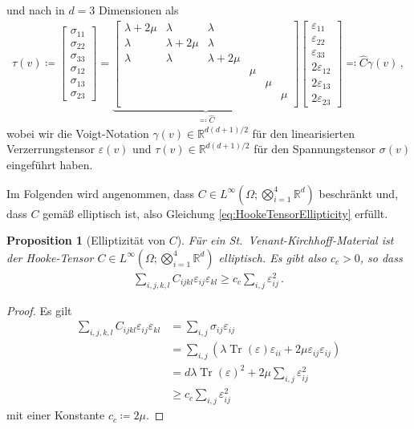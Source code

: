 \documentclass{scrartcl}
\newcounter{everything}
\newtheorem{proposition}[everything]{Proposition}
\def\R{\mathbb{R}}
\def\e{\varepsilon}
\newcommand{\hC}{\hat{C}}
\DeclareMathOperator{\Tr}{Tr}       	  %
\newcommand{\vect}[1]{\begin{bmatrix} #1 \end{bmatrix}}
\begin{document}
und nach \cite[S.246]{Alb-2002} in $d=3$ Dimensionen als
\begin{align}
	\tau(v)\coloneqq
	\vect{\sigma_{11} \\ \sigma_{22} \\ \sigma_{33} \\ \sigma_{12} \\ \sigma_{13} \\ \sigma_{23}}
	= \underbrace{\begin{bmatrix}
		\lambda+2\mu & \lambda & \lambda & & & \\
		\lambda & \lambda+2\mu & \lambda & & & \\
		\lambda & \lambda & \lambda+2\mu & & & \\
		& & & \mu & & \\
		& & & & \mu & \\
		& & & & & \mu \\
	\end{bmatrix}}_{\eqqcolon \hC}
	\vect{\e_{11} \\ \e_{22} \\ \e_{33} \\ 2\e_{12} \\ 2\e_{13} \\ 2\e_{23}}
	\eqqcolon \hC\gamma(v)\,,
	\label{eq:DefinitionVoigtD3}
\end{align}
wobei wir die Voigt-Notation $\gamma(v)\in\R^{d(d+1)/2}$ für den linearisierten Verzerrungstensor $\e(v)$ und $\tau(v)\in\R^{d(d+1)/2}$ für den Spannungstensor $\sigma(v)$ eingeführt haben.

Im Folgenden wird angenommen, dass $C\in L^\infty(\Omega;\bigotimes_{i=1}^4\R^d)$ beschränkt und, dass $C$ gemäß \cite[S.103]{Duv-1976} elliptisch ist, also Gleichung \eqref{eq:HookeTensorEllipticity} erfüllt.

\begin{proposition}[Elliptizität von $C$]\label{pr:elliptizitaetc}
	Für ein St.\ Venant-Kirchhoff-Material ist der Hooke-Tensor $C\in L^\infty(\Omega;\bigotimes_{i=1}^4\R^d)$ elliptisch. Es gibt also $c_c>0$, so dass
	\begin{align}
	\sum_{i,j,k,l}C_{ijkl}\e_{ij}\e_{kl}\geq c_c\sum_{i,j}\e_{ij}^2\,.
	\label{eq:HookeTensorEllipticity}
	\end{align}
\end{proposition}
\begin{proof}
	Es gilt
	\begin{align*}
		\sum_{i,j,k,l}C_{ijkl}\e_{ij}\e_{kl}
		&= \sum_{i,j}\sigma_{ij}\e_{ij} \\
		&= \sum_{i,j}\left(\lambda\Tr(\e)\e_{ii}+2\mu\e_{ij}\e_{ij}\right) \\
		&= d\lambda\Tr(\e)^2+2\mu\sum_{i,j}\e_{ij}^2 \\
		&\geq c_c\sum_{i,j}\e_{ij}^2
	\end{align*}
	mit einer Konstante $c_c\coloneqq 2\mu$.
\end{proof}
\end{document}
